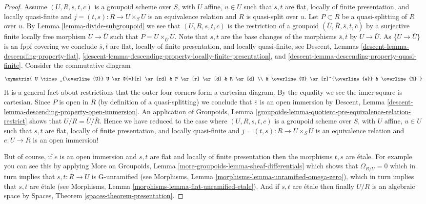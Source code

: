\begin{proof}
\medskip\noindent
Assume $(U, R, s, t, c)$ is a groupoid scheme over $S$,
with $U$ affine, $u \in U$ such that $s, t$ are flat, locally
of finite presentation, and locally quasi-finite and
$j = (t, s) : R \to U \times_S U$ is an equivalence relation
and $R$ is quasi-split over $u$. Let $P \subset R$ be a quasi-splitting
of $R$ over $u$. By
Lemma \ref{lemma-divide-subgroupoid}
we see that $(U, R, s, t, c)$ is the restriction of a groupoid
$(\overline{U}, \overline{R}, \overline{s}, \overline{t}, \overline{c})$
by a surjective finite locally free morphism $U \to \overline{U}$ such that
$P = U \times_{\overline{U}} U$.
Note that $s, t$ are the base changes of the morphisms
$\overline{s}, \overline{t}$ by $U \to \overline{U}$.
As $\{U \to \overline{U}\}$ is an fppf covering we conclude
$\overline{s}, \overline{t}$ are flat, locally of finite presentation, and
locally quasi-finite, see
Descent, Lemmas \ref{descent-lemma-descending-property-flat},
\ref{descent-lemma-descending-property-locally-finite-presentation}, and
\ref{descent-lemma-descending-property-quasi-finite}.
Consider the commutative diagram
$$
\xymatrix{
U \times_{\overline{U}} U \ar@{=}[r] \ar[rd] & P \ar[r] \ar[d] & R \ar[d] \\
& \overline{U} \ar[r]^{\overline{e}} & \overline{R}
}
$$
It is a general fact about restrictions that the outer four corners
form a cartesian diagram. By the equality we see the inner square is
cartesian. Since $P$ is open in $R$ (by definition of a quasi-splitting)
we conclude that $\overline{e}$ is an open immersion by
Descent, Lemma \ref{descent-lemma-descending-property-open-immersion}.
An application of
Groupoids,
Lemma \ref{groupoids-lemma-quotient-pre-equivalence-relation-restrict}
shows that $U/R = \overline{U}/\overline{R}$. Hence we have reduced to
the case where $(U, R, s, t, c)$ is a groupoid scheme over $S$,
with $U$ affine, $u \in U$ such that $s, t$ are flat, locally
of finite presentation, and locally quasi-finite and
$j = (t, s) : R \to U \times_S U$ is an equivalence relation
and $e : U \to R$ is an open immersion!

\medskip\noindent
But of course, if $e$ is an open immersion and
$s, t$ are flat and locally of finite presentation
then the morphisms $t, s$ are \'etale.
For example you can see this by applying
More on Groupoids, Lemma \ref{more-groupoids-lemma-sheaf-differentials}
which shows that $\Omega_{R/U} = 0$ which in turn implies
that $s, t : R \to U$ is G-unramified (see
Morphisms, Lemma \ref{morphisms-lemma-unramified-omega-zero}),
which in turn implies that $s, t$ are \'etale (see
Morphisms, Lemma \ref{morphisms-lemma-flat-unramified-etale}).
And if $s, t$ are \'etale then finally $U/R$ is an algebraic
space by
Spaces, Theorem \ref{spaces-theorem-presentation}.
\end{proof}





